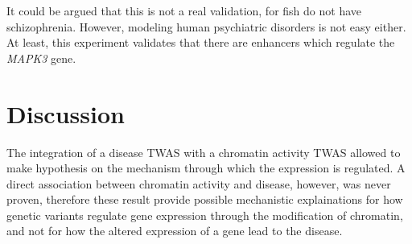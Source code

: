 \documentclass[../main.tex]{subfiles}
\begin{document}
It could be argued that this is not a real validation, for fish do not 
have schizophrenia. However, modeling human psychiatric disorders is not 
easy either. At least, this experiment validates that there are 
enhancers which regulate the \textit{MAPK3} gene.

\section{Discussion}

The integration of a disease TWAS with a chromatin activity TWAS allowed 
to make hypothesis on the mechanism through which the expression is 
regulated. A direct association between chromatin activity and disease, 
however, was never proven, therefore these result 
provide possible mechanistic explainations for how genetic variants 
regulate gene expression through the modification of chromatin, and not 
for how the altered expression of a gene lead to the disease.

\end{document}
